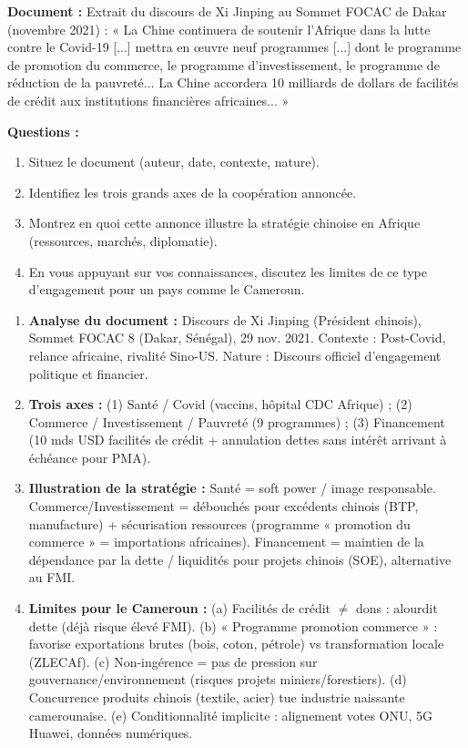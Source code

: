 \documentclass[11pt]{article}
\begin{document}
\begin{exercice}
\textbf{Document :} Extrait du discours de Xi Jinping au Sommet FOCAC de Dakar (novembre 2021) : « La Chine continuera de soutenir l'Afrique dans la lutte contre le Covid-19 [...] mettra en œuvre neuf programmes [...] dont le programme de promotion du commerce, le programme d'investissement, le programme de réduction de la pauvreté... La Chine accordera 10 milliards de dollars de facilités de crédit aux institutions financières africaines... »

\textbf{Questions :}
\begin{enumerate}
    \item Situez le document (auteur, date, contexte, nature).
    \item Identifiez les trois grands axes de la coopération annoncée.
    \item Montrez en quoi cette annonce illustre la stratégie chinoise en Afrique (ressources, marchés, diplomatie).
    \item En vous appuyant sur vos connaissances, discutez les limites de ce type d'engagement pour un pays comme le Cameroun.
\end{enumerate}
\end{exercice}

\begin{corrige}[Exercice n°1]
\begin{enumerate}
    \item \textbf{Analyse du document :} Discours de Xi Jinping (Président chinois), Sommet FOCAC 8 (Dakar, Sénégal), 29 nov. 2021. Contexte : Post-Covid, relance africaine, rivalité Sino-US. Nature : Discours officiel d'engagement politique et financier.
    \item \textbf{Trois axes :} (1) Santé / Covid (vaccins, hôpital CDC Afrique) ; (2) Commerce / Investissement / Pauvreté (9 programmes) ; (3) Financement (10 mds USD facilités de crédit + annulation dettes sans intérêt arrivant à échéance pour PMA).
    \item \textbf{Illustration de la stratégie :} Santé = soft power / image responsable. Commerce/Investissement = débouchés pour excédents chinois (BTP, manufacture) + sécurisation ressources (programme « promotion du commerce » = importations africaines). Financement = maintien de la dépendance par la dette / liquidités pour projets chinois (SOE), alternative au FMI.
    \item \textbf{Limites pour le Cameroun :} (a) Facilités de crédit $\neq$ dons : alourdit dette (déjà risque élevé FMI). (b) « Programme promotion commerce » : favorise exportations brutes (bois, coton, pétrole) vs transformation locale (ZLECAf). (c) Non-ingérence = pas de pression sur gouvernance/environnement (risques projets miniers/forestiers). (d) Concurrence produits chinois (textile, acier) tue industrie naissante camerounaise. (e) Conditionnalité implicite : alignement votes ONU, 5G Huawei, données numériques.
\end{enumerate}
\end{corrige}
\end{document}
